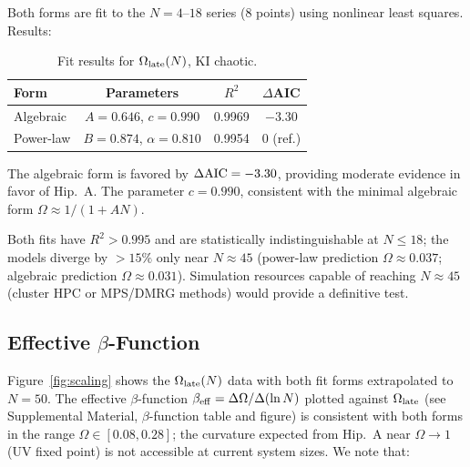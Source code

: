\documentclass[twocolumn,showpacs,preprintnumbers,amsmath,amssymb,aps,prl]{revtex4-2}
\begin{document}
Both forms are fit to the $N = 4$--$18$ series (8 points) using nonlinear least
squares. Results:

\begin{table}[h]
\caption{Fit results for $\Omega_{\rm late}(N)$, KI chaotic.}
\label{tab:fits}
\begin{ruledtabular}
\begin{tabular}{lccc}
Form & Parameters & $R^2$ & $\Delta$AIC \\
\hline
Algebraic & $A = 0.646$, $c = 0.990$ & 0.9969 & $-3.30$ \\
Power-law & $B = 0.874$, $\alpha = 0.810$ & 0.9954 & 0 (ref.) \\
\end{tabular}
\end{ruledtabular}
\end{table}

The algebraic form is favored by $\Delta{\rm AIC} = -3.30$, providing moderate
evidence in favor of Hip.~A. The parameter $c = 0.990$, consistent with the
minimal algebraic form $\Omega \approx 1/(1+AN)$.

Both fits have $R^2 > 0.995$ and are statistically indistinguishable at $N \leq 18$;
the models diverge by $> 15\%$ only near $N \approx 45$ (power-law prediction
$\Omega \approx 0.037$; algebraic prediction $\Omega \approx 0.031$). Simulation
resources capable of reaching $N \approx 45$ (cluster HPC or MPS/DMRG methods)
would provide a definitive test.

\subsection{Effective $\beta$-Function}

Figure~\ref{fig:scaling} shows the $\Omega_{\rm late}(N)$ data with both fit
forms extrapolated to $N=50$. The effective $\beta$-function
$\beta_{\rm eff} = \Delta\Omega/\Delta(\ln N)$ plotted against $\Omega_{\rm late}$
(see Supplemental Material, $\beta$-function table and figure) is consistent with
both forms in the range $\Omega \in [0.08, 0.28]$; the curvature expected from
Hip.~A near $\Omega \to 1$ (UV fixed point) is not accessible at current system
sizes. We note that:
\end{document}
